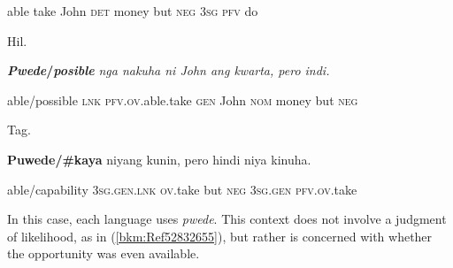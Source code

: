 \begin{stylelsIMT}
able take John \textsc{det} money but \textsc{neg} 3\textsc{sg pfv} do
\end{stylelsIMT}

\begin{listWWNumiileveli}
\item 
\begin{listWWNumiilevelii}
\item 
\begin{stylelsLanginfo}
Hil.
\end{stylelsLanginfo}
\end{listWWNumiilevelii}
\end{listWWNumiileveli}
\begin{stylelsIMT}
\textbf{\textit{Pwede}}\textbf{/}\textbf{\textit{posible}}\textit{ nga nakuha ni John ang kwarta, pero indi.}
\end{stylelsIMT}

\begin{stylelsIMT}
able/possible \textsc{lnk pfv.ov}.able.take \textsc{gen} John \textsc{nom} money but \textsc{neg}
\end{stylelsIMT}

\begin{listWWNumiileveli}
\item 
\begin{listWWNumiilevelii}
\item 
\begin{stylelsLanginfo}
Tag.
\end{stylelsLanginfo}
\end{listWWNumiilevelii}
\end{listWWNumiileveli}
\begin{stylelsSourceline}
\textbf{\textup{Puwede}}\textbf{/}\textbf{\textup{\#kaya}}\textup{ niyang kunin, pero hindi niya kinuha.}
\end{stylelsSourceline}

\begin{stylelsSourceline}
\textup{able/capability 3}\textsc{sg.gen.lnk ov.}\textup{take but }\textsc{neg}\textup{ 3}\textsc{sg.gen pfv.ov}\textup{.take}
\end{stylelsSourceline}

\begin{styleStandard}
In this case, each language uses \textit{pwede}. This context does not involve a judgment of likelihood, as in (\ref{bkm:Ref52832655}), but rather is concerned with whether the opportunity was even available.
\end{styleStandard}


